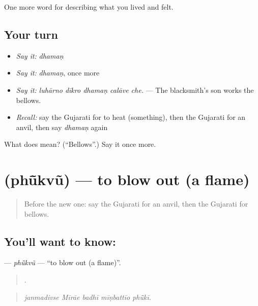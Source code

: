 \begin{grammarlens}[title={What you've built}]
One more word for describing what you lived and felt.
\end{grammarlens}

\subsection*{Your turn}
\begin{itemize}
\raggedright
  \item \emph{Say it:} \emph{dhamaṇ}
  \item \emph{Say it:} \emph{dhamaṇ}, once more
  \item \emph{Say it:} \emph{luhārno dīkro dhamaṇ calāve che.} — The blacksmith's son works the bellows.
  \item \emph{Recall:} say the Gujarati for to heat (something), then the Gujarati for an anvil, then say \emph{dhamaṇ} again
\end{itemize}

\begin{tcolorbox}[breakable,colback=teal!4,colframe=teal!35!black,title={Before you move on}]
What does  mean? (\textquotedblleft{}Bellows\textquotedblright{}.) Say it once more.
\end{tcolorbox}
\section[\texorpdfstring{\gu{ફૂંકવું} (phū̃kvũ)}{ફૂંકવું (phū̃kvũ)}]{ (phū̃kvũ) — to blow out (a flame)}

\label{lesson:GU-C509-phukvu}



\begin{quote}
Before the new one: say the Gujarati for an anvil, then the Gujarati for bellows.
\end{quote}

\subsection*{You'll want to know: }
\textbf{} — \emph{phū̃kvũ} — \textquotedblleft{}to blow out (a flame)\textquotedblright{}.

\begin{quote}
    .
\end{quote}

\begin{quote}
\emph{janmadivse Mīrāe badhī mīṇbattīo phū̃kī.}
\end{quote}

